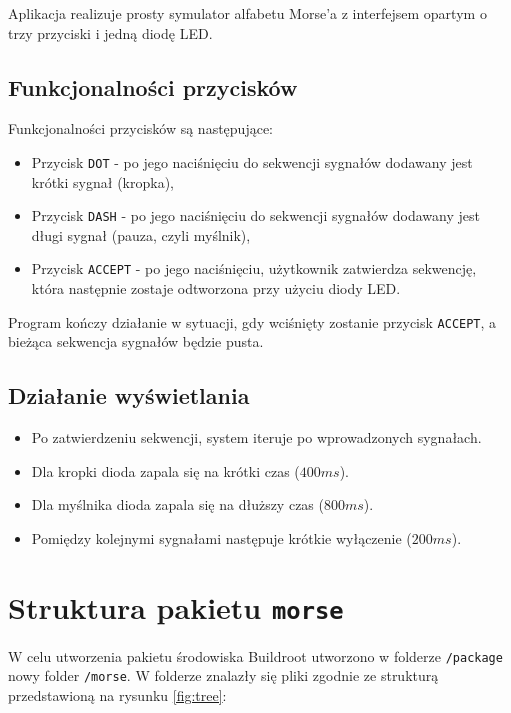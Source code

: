 \documentclass{article}
\begin{document}
Aplikacja realizuje prosty symulator alfabetu Morse'a z interfejsem opartym o trzy przyciski i jedną diodę LED.

\subsection{Funkcjonalności przycisków}

Funkcjonalności przycisków są następujące:

\begin{itemize}
    \item Przycisk \texttt{DOT} - po jego naciśnięciu do sekwencji sygnałów dodawany jest krótki sygnał (kropka),
    \item Przycisk \texttt{DASH} - po jego naciśnięciu do sekwencji sygnałów dodawany jest długi sygnał (pauza, czyli myślnik),
    \item Przycisk \texttt{ACCEPT} - po jego naciśnięciu, użytkownik zatwierdza sekwencję, która następnie zostaje odtworzona przy użyciu diody LED.
\end{itemize}

Program kończy działanie w sytuacji, gdy wciśnięty zostanie przycisk \texttt{ACCEPT}, a bieżąca sekwencja sygnałów będzie pusta.

\subsection{Działanie wyświetlania}

\begin{itemize}
    \item Po zatwierdzeniu sekwencji, system iteruje po wprowadzonych sygnałach.
    \item Dla kropki dioda zapala się na krótki czas ($400ms$).
    \item Dla myślnika dioda zapala się na dłuższy czas ($800ms$).
    \item Pomiędzy kolejnymi sygnałami następuje krótkie wyłączenie ($200ms$).
\end{itemize}

\section{Struktura pakietu \texttt{morse}}

W celu utworzenia pakietu środowiska Buildroot utworzono w folderze \texttt{/package} nowy folder \texttt{/morse}. W folderze znalazły się pliki zgodnie ze strukturą przedstawioną na rysunku \ref{fig:tree}:
\end{document}
